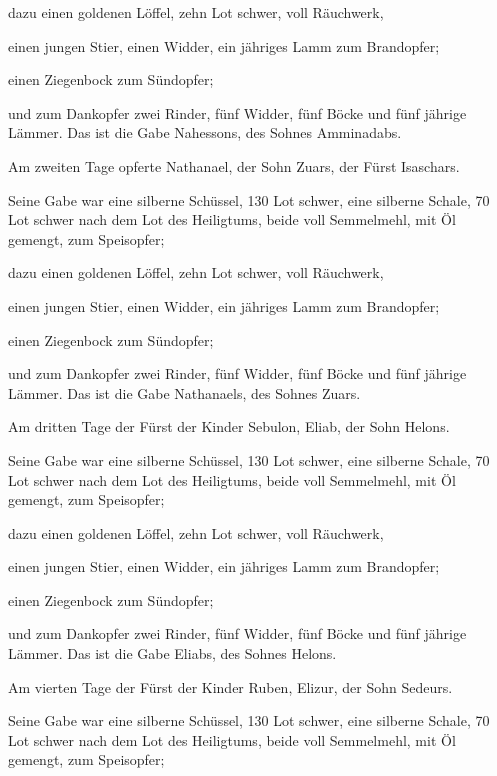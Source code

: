 dazu einen goldenen Löffel, zehn Lot schwer, voll
Räuchwerk,

 einen jungen Stier, einen Widder, ein jähriges Lamm zum
Brandopfer;

 einen Ziegenbock zum Sündopfer;

 und zum Dankopfer zwei Rinder, fünf Widder, fünf Böcke
und fünf jährige Lämmer. Das ist die Gabe Nahessons, des Sohnes
Amminadabs.

 Am zweiten Tage opferte Nathanael, der Sohn Zuars, der
Fürst Isaschars.

 Seine Gabe war eine silberne Schüssel, 130 Lot schwer,
eine silberne Schale, 70 Lot schwer nach dem Lot des Heiligtums, beide
voll Semmelmehl, mit Öl gemengt, zum Speisopfer;

 dazu einen goldenen Löffel, zehn Lot schwer, voll
Räuchwerk,

 einen jungen Stier, einen Widder, ein jähriges Lamm zum
Brandopfer;

 einen Ziegenbock zum Sündopfer;

 und zum Dankopfer zwei Rinder, fünf Widder, fünf Böcke
und fünf jährige Lämmer. Das ist die Gabe Nathanaels, des Sohnes Zuars.

 Am dritten Tage der Fürst der Kinder Sebulon, Eliab, der
Sohn Helons.

 Seine Gabe war eine silberne Schüssel, 130 Lot schwer,
eine silberne Schale, 70 Lot schwer nach dem Lot des Heiligtums, beide
voll Semmelmehl, mit Öl gemengt, zum Speisopfer;

 dazu einen goldenen Löffel, zehn Lot schwer, voll
Räuchwerk,

 einen jungen Stier, einen Widder, ein jähriges Lamm zum
Brandopfer;

 einen Ziegenbock zum Sündopfer;

 und zum Dankopfer zwei Rinder, fünf Widder, fünf Böcke
und fünf jährige Lämmer. Das ist die Gabe Eliabs, des Sohnes Helons.

 Am vierten Tage der Fürst der Kinder Ruben, Elizur, der
Sohn Sedeurs.

 Seine Gabe war eine silberne Schüssel, 130 Lot schwer,
eine silberne Schale, 70 Lot schwer nach dem Lot des Heiligtums, beide
voll Semmelmehl, mit Öl gemengt, zum Speisopfer;

